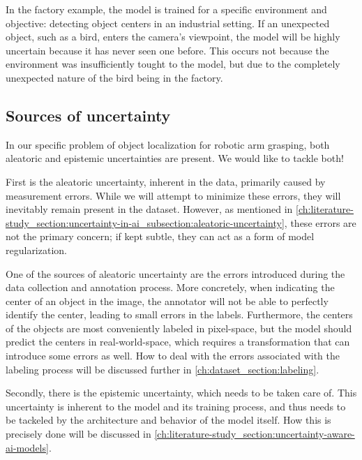 In the factory example, the model is trained for a specific environment and objective: detecting object centers in an industrial setting.
If an unexpected object, such as a bird, enters the camera's viewpoint, the model will be highly uncertain because it has never seen one before.
This occurs not because the environment was insufficiently tought to the model, but due to the completely unexpected nature of the bird being in the factory.

\subsection{Sources of uncertainty} \label{ch:literature-study_section:uncertainty-in-ai_subsection:sources-of-uncertainty}
In our specific problem of object localization for robotic arm grasping, both aleatoric and epistemic uncertainties are present.
We would like to tackle both!

First is the aleatoric uncertainty, inherent in the data, primarily caused by measurement errors.
While we will attempt to minimize these errors, they will inevitably remain present in the dataset.
However, as mentioned in \cref{ch:literature-study_section:uncertainty-in-ai_subsection:aleatoric-uncertainty}, these errors are not the primary concern; if kept subtle, they can act as a form of model regularization.

One of the sources of aleatoric uncertainty are the errors introduced during the data collection and annotation process.
More concretely, when indicating the center of an object in the image, the annotator will not be able to perfectly identify the center, leading to small errors in the labels.
Furthermore, the centers of the objects are most conveniently labeled in pixel-space, but the model should predict the centers in real-world-space, which requires a transformation that can introduce some errors as well.
How to deal with the errors associated with the labeling process will be discussed further in \cref{ch:dataset_section:labeling}.

Secondly, there is the epistemic uncertainty, which needs to be taken care of.
This uncertainty is inherent to the model and its training process, and thus needs to be tackeled by the architecture and behavior of the model itself.
How this is precisely done will be discussed in \cref{ch:literature-study_section:uncertainty-aware-ai-models}.

